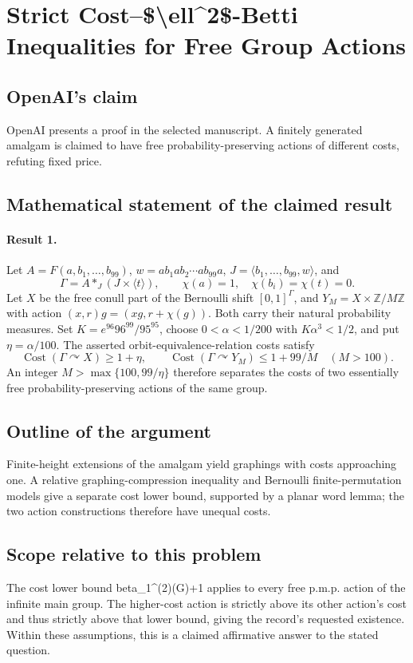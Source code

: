 \documentclass[11pt]{article}
\begin{document}
\section*{Strict Cost–\$\textbackslash{}ell\textasciicircum{}2\$-Betti Inequalities for Free Group Actions}

\subsection{OpenAI's claim}
OpenAI presents a proof in the selected manuscript. A finitely generated amalgam is claimed to have free probability-preserving actions of different costs, refuting fixed price.

\subsection{Mathematical statement of the claimed result}
\paragraph{Result 1.} Let \(A=F(a,b_1,\ldots,b_{99})\), \(w=ab_1ab_2\cdots ab_{99}a\), \(J=\langle b_1,\ldots,b_{99},w\rangle\), and
\[
 \Gamma=A*_J(J\times\langle t\rangle),\qquad\chi(a)=1,\quad\chi(b_i)=\chi(t)=0.
\]
Let \(X\) be the free conull part of the Bernoulli shift \([0,1]^\Gamma\), and \(Y_M=X\times\mathbb Z/M\mathbb Z\) with action \((x,r)g=(xg,r+\chi(g))\). Both carry their natural probability measures. Set \(K=e^{96}96^{99}/95^{95}\), choose \(0<\alpha<1/200\) with \(K\alpha^3<1/2\), and put \(\eta=\alpha/100\). The asserted orbit-equivalence-relation costs satisfy
\[
 \operatorname{Cost}(\Gamma\curvearrowright X)\ge1+\eta,\qquad
 \operatorname{Cost}(\Gamma\curvearrowright Y_M)\le1+99/M\quad(M>100).
\]
An integer \(M>\max\{100,99/\eta\}\) therefore separates the costs of two essentially free probability-preserving actions of the same group.

\subsection{Outline of the argument}
Finite-height extensions of the amalgam yield graphings with costs approaching one. A relative graphing-compression inequality and Bernoulli finite-permutation models give a separate cost lower bound, supported by a planar word lemma; the two action constructions therefore have unequal costs.

\subsection{Scope relative to this problem}
The cost lower bound beta\_1\textasciicircum{}(2)(G)+1 applies to every free p.m.p. action of the infinite main group. The higher-cost action is strictly above its other action’s cost and thus strictly above that lower bound, giving the record’s requested existence. Within these assumptions, this is a claimed affirmative answer to the stated question.
\end{document}
